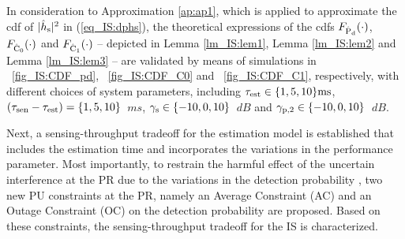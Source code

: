In consideration to Approximation \ref{ap:ap1}, which is applied to approximate the cdf of $|\hat{h}_{\text{s}}|^2$ in (\ref{eq_IS:dphs}), the theoretical expressions of the cdfs $F_{\hat{\text{P}}_{\text{d}}}(\cdot)$, $F_{\hat{\text{C}}_{\text{0}}}(\cdot)$ and $F_{\hat{\text{C}}_{\text{1}}}(\cdot)$ -- depicted in Lemma \ref{lm_IS:lem1}, Lemma \ref{lm_IS:lem2} and Lemma \ref{lm_IS:lem3} -- are validated by means of simulations in \figurename~\ref{fig_IS:CDF_pd}, \figurename~\ref{fig_IS:CDF_C0} and \figurename~\ref{fig_IS:CDF_C1}, respectively, with different choices of system parameters, including $\tau_{\text{est}} \in \{1,5,10\} \SI{}{ms}$, $(\tau_{\text{sen}} - \tau_{\text{est}}) = \{1,5,10\}$ $\SI{}{ms}$, ${\gamma}_{\text{s}} \in \{-10, 0, 10\}$ $\SI{}{dB}$ and  ${\gamma}_{\text{p,2}} \in \{-10, 0, 10\}$ $\SI{}{dB}$. 

Next, a sensing-throughput tradeoff for the estimation model is established that includes the estimation time and incorporates the variations in the performance parameter. Most importantly, to restrain the harmful effect of the uncertain interference at the PR due to the variations in the detection probability%
, two new PU constraints at the PR, namely an Average Constraint (AC) and an Outage Constraint (OC) on the detection probability are proposed. Based on these constraints, the sensing-throughput tradeoff for the IS is characterized. 


